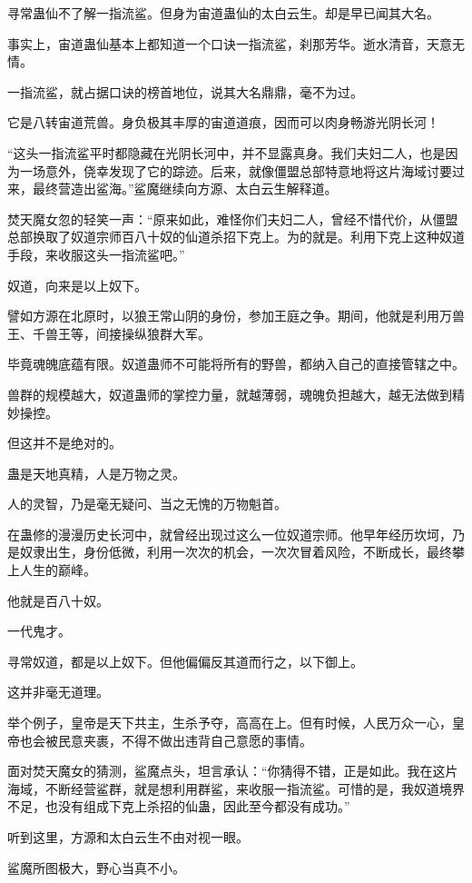 \begin{this_body}
寻常蛊仙不了解一指流鲨。但身为宙道蛊仙的太白云生。却是早已闻其大名。

事实上，宙道蛊仙基本上都知道一个口诀一指流鲨，刹那芳华。逝水清音，天意无情。

一指流鲨，就占据口诀的榜首地位，说其大名鼎鼎，毫不为过。

它是八转宙道荒兽。身负极其丰厚的宙道道痕，因而可以肉身畅游光阴长河！

“这头一指流鲨平时都隐藏在光阴长河中，并不显露真身。我们夫妇二人，也是因为一场意外，侥幸发现了它的踪迹。后来，就像僵盟总部特意地将这片海域讨要过来，最终营造出鲨海。”鲨魔继续向方源、太白云生解释道。

焚天魔女忽的轻笑一声：“原来如此，难怪你们夫妇二人，曾经不惜代价，从僵盟总部换取了奴道宗师百八十奴的仙道杀招下克上。为的就是。利用下克上这种奴道手段，来收服这头一指流鲨吧。”

奴道，向来是以上奴下。

譬如方源在北原时，以狼王常山阴的身份，参加王庭之争。期间，他就是利用万兽王、千兽王等，间接操纵狼群大军。

毕竟魂魄底蕴有限。奴道蛊师不可能将所有的野兽，都纳入自己的直接管辖之中。

兽群的规模越大，奴道蛊师的掌控力量，就越薄弱，魂魄负担越大，越无法做到精妙操控。

但这并不是绝对的。

蛊是天地真精，人是万物之灵。

人的灵智，乃是毫无疑问、当之无愧的万物魁首。

在蛊修的漫漫历史长河中，就曾经出现过这么一位奴道宗师。他早年经历坎坷，乃是奴隶出生，身份低微，利用一次次的机会，一次次冒着风险，不断成长，最终攀上人生的巅峰。

他就是百八十奴。

一代鬼才。

寻常奴道，都是以上奴下。但他偏偏反其道而行之，以下御上。

这并非毫无道理。

举个例子，皇帝是天下共主，生杀予夺，高高在上。但有时候，人民万众一心，皇帝也会被民意夹裹，不得不做出违背自己意愿的事情。

面对焚天魔女的猜测，鲨魔点头，坦言承认：“你猜得不错，正是如此。我在这片海域，不断经营鲨群，就是想利用群鲨，来收服一指流鲨。可惜的是，我奴道境界不足，也没有组成下克上杀招的仙蛊，因此至今都没有成功。”

听到这里，方源和太白云生不由对视一眼。

鲨魔所图极大，野心当真不小。


\end{this_body}
